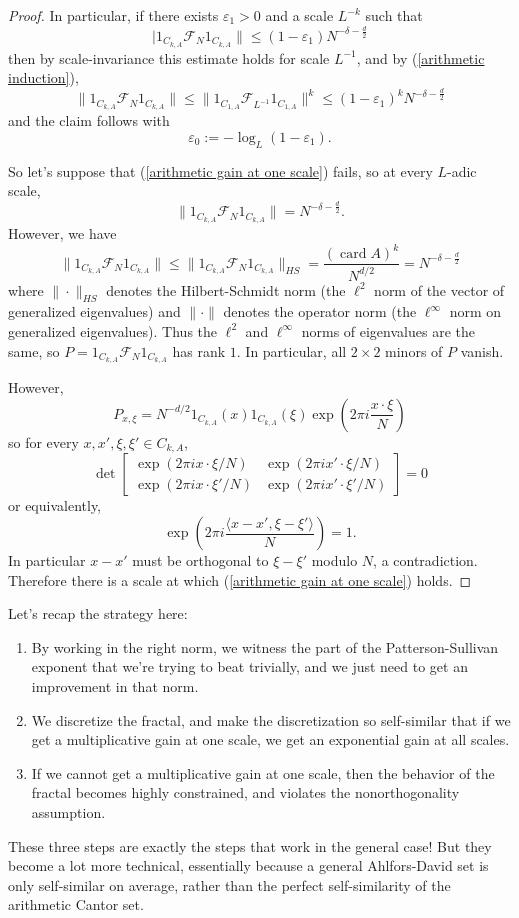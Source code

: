 \documentclass[reqno,12pt]{amsart}
\DeclareMathOperator{\card}{card}
\theoremstyle{definition}
\numberwithin{equation}{section}
\begin{document}
\begin{proof}
In particular, if there exists $\varepsilon_1 > 0$ and a scale $L^{-k}$ such that 
\begin{equation}\label{arithmetic gain at one scale}
    |1_{C_{k, A}} \mathcal F_N 1_{C_{k, A}}\| \leq (1 - \varepsilon_1) N^{-\delta - \frac{d}{2}}
\end{equation}
then by scale-invariance this estimate holds for scale $L^{-1}$, and by (\ref{arithmetic induction}),
$$\|1_{C_{k, A}} \mathcal F_N 1_{C_{k, A}}\| \leq \|1_{C_{1, A}} \mathcal F_{L^{-1}} 1_{C_{1, A}}\|^k \leq (1 - \varepsilon_1)^k N^{-\delta - \frac{d}{2}}$$
and the claim follows with
$$\varepsilon_0 := -\log_L(1 - \varepsilon_1).$$

So let's suppose that (\ref{arithmetic gain at one scale}) fails, so at every $L$-adic scale, 
$$\|1_{C_{k, A}} \mathcal F_N 1_{C_{k, A}}\| = N^{-\delta - \frac{d}{2}}.$$
However, we have 
$$\|1_{C_{k, A}} \mathcal F_N 1_{C_{k, A}}\| \leq \|1_{C_{k, A}} \mathcal F_N 1_{C_{k, A}}\|_{HS} = \frac{(\card A)^k}{N^{d/2}} = N^{-\delta - \frac{d}{2}}$$
where $\|\cdot\|_{HS}$ denotes the Hilbert-Schmidt norm (the $\ell^2$ norm of the vector of generalized eigenvalues) and $\|\cdot\|$ denotes the operator norm (the $\ell^\infty$ norm on generalized eigenvalues).
Thus the $\ell^2$ and $\ell^\infty$ norms of eigenvalues are the same, so $P = 1_{C_{k, A}} \mathcal F_N 1_{C_{k, A}}$ has rank $1$.
In particular, all $2 \times 2$ minors of $P$ vanish.

However, 
$$P_{x, \xi} = N^{-d/2} 1_{C_{k, A}}(x) 1_{C_{k, A}}(\xi) \exp\left(2\pi i\frac{x \cdot \xi}{N}\right)$$
so for every $x, x', \xi, \xi' \in C_{k, A}$,
$$\det \begin{bmatrix}\exp(2\pi ix\cdot \xi/N) & \exp(2\pi ix'\cdot \xi/N) \\ \exp(2\pi ix\cdot \xi'/N) & \exp(2\pi ix'\cdot \xi'/N)\end{bmatrix} = 0$$
or equivalently,
$$\exp\left(2\pi i \frac{\langle x - x', \xi - \xi'\rangle}{N}\right) = 1.$$
In particular $x - x'$ must be orthogonal to $\xi - \xi'$ modulo $N$, a contradiction.
Therefore there is a scale at which (\ref{arithmetic gain at one scale}) holds.
\end{proof}

Let's recap the strategy here:
\begin{enumerate}
\item By working in the right norm, we witness the part of the Patterson-Sullivan exponent that we're trying to beat trivially, and we just need to get an improvement in that norm.
\item We discretize the fractal, and make the discretization so self-similar that if we get a multiplicative gain at one scale, we get an exponential gain at all scales.
\item If we cannot get a multiplicative gain at one scale, then the behavior of the fractal becomes highly constrained, and violates the nonorthogonality assumption.
\end{enumerate}
These three steps are exactly the steps that work in the general case! But they become a lot more technical, essentially because a general Ahlfors-David set is only self-similar on average, rather than the perfect self-similarity of the arithmetic Cantor set.
\end{document}
